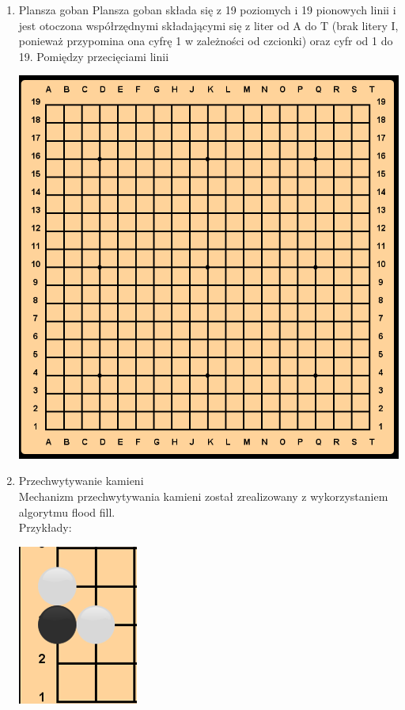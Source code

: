 \documentclass{article}
\begin{document}
\begin{enumerate}
    \item Plansza goban
    Plansza goban składa się z 19 poziomych i 19 pionowych linii i jest 
    otoczona współrzędnymi składającymi się z liter od A do T 
    (brak litery I, ponieważ przypomina ona cyfrę 1 w zależności od
    czcionki) oraz cyfr od 1 do 19. Pomiędzy przecięciami linii 

    \begin{center}
        \includegraphics{imgs/goban.png}
    \end{center}
    \item Przechwytywanie kamieni\\
    Mechanizm przechwytywania kamieni został zrealizowany z wykorzystaniem
    algorytmu flood fill.\\
    Przykłady:\\
    \begin{center}
        \includegraphics{imgs/capture1a.png}

\end{center}
\end{enumerate}
\end{document}

